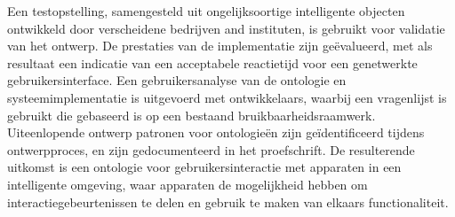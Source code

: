 Een testopstelling, samengesteld uit ongelijksoortige intelligente objecten ontwikkeld door verscheidene bedrijven and instituten, is gebruikt voor validatie van het ontwerp. De prestaties van de implementatie zijn ge\"evalueerd, met als resultaat een indicatie van een acceptabele reactietijd voor een genetwerkte gebruikersinterface. Een gebruikersanalyse van de ontologie en systeemimplementatie is uitgevoerd met ontwikkelaars, waarbij een vragenlijst is gebruikt die gebaseerd is op een bestaand bruikbaarheidsraamwerk. Uiteenlopende ontwerp patronen voor ontologie\"en zijn ge\"identificeerd tijdens ontwerpproces, en zijn gedocumenteerd in het proefschrift.
De resulterende uitkomst is een ontologie voor gebruikersinteractie met apparaten in een intelligente omgeving, waar apparaten de mogelijkheid hebben om interactiegebeurtenissen te delen en gebruik te maken van elkaars functionaliteit. 



\endgroup			

\vfill